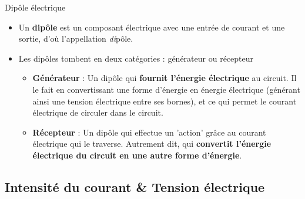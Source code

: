 \documentclass[11pt,a4paper]{article}
\begin{document}
\begin{defn}{Dipôle électrique}
\begin{itemize}
    \item Un \textbf{dipôle} est un composant électrique avec une entrée de courant et une sortie, d'où l'appellation \textit{di}pôle. 
    \item Les dipôles tombent en deux catégories : générateur ou récepteur
    \begin{itemize}
        \item \textbf{Générateur} : Un dipôle qui \textbf{fournit l'énergie électrique} au circuit. Il le fait en convertissant une forme d'énergie en énergie électrique (générant ainsi une tension électrique entre ses bornes), et ce qui permet le courant électrique de circuler dans le circuit. 
        \item \textbf{Récepteur} : Un dipôle qui effectue un 'action' grâce au courant électrique qui le traverse. Autrement dit, qui \textbf{convertit l'énergie électrique du circuit en une autre forme d'énergie}. 
    \end{itemize}
\end{itemize}
\end{defn}

\subsection{Intensité du courant \& Tension électrique}
\end{document}
